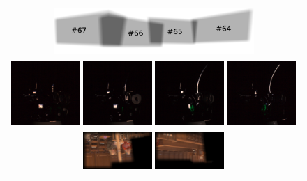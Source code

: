    \begin{figure}[H]
    \centering
    \begin{tabular}{c}
      \includegraphics[width=0.7\textwidth]{../graphics/ergebnisse/result_part_cubemap.png}
\\
      \includegraphics[width=0.24\textwidth]{../graphics/ergebnisse/result_part_67.png}
      \includegraphics[width=0.24\textwidth]{../graphics/ergebnisse/result_part_66.png}
      \includegraphics[width=0.24\textwidth]{../graphics/ergebnisse/result_part_65.png}
      \includegraphics[width=0.24\textwidth]{../graphics/ergebnisse/result_part_64.png}
 \\
      \includegraphics[width=0.24\textwidth]{../graphics/ergebnisse/result_screen_67.jpg}
      \includegraphics[width=0.24\textwidth]{../graphics/ergebnisse/result_screen_66.jpg}

\end{tabular}
\end{figure}
